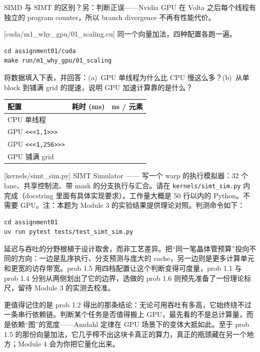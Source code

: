 \documentclass[11pt,a4paper,fontset=none]{ctexart}
\begin{document}
SIMD 与 SIMT 的区别？另：判断正误——Nvidia GPU 在 Volta 之后每个线程有独立的 program counter，所以 branch divergence 不再有性能代价。

[cuda/m1\_why\_gpu/01\_scaling.cu]
同一个向量加法，四种配置各跑一遍。

\begin{lstlisting}
cd assignment01/cuda
make run/m1_why_gpu/01_scaling
\end{lstlisting}

将数据填入下表，并回答：(a)~GPU 单线程为什么比 CPU 慢这么多？(b)~从单 block 到铺满 grid 的提速，说明 GPU 加速计算靠的是什么？

\begin{center}\small
\begin{tabular}{@{}lll@{}}
\toprule
配置 & 耗时 (ms) & ns / 元素 \\
\midrule
CPU 单线程 & & \\
GPU \texttt{<<<1,1>>>} & & \\
GPU \texttt{<<<1,256>>>} & & \\
GPU 铺满 grid & & \\
\bottomrule
\end{tabular}
\end{center}

[kernels/simt\_sim.py]
SIMT Simulator —— 写一个 warp 的执行模拟器：32 个 lane、共享控制流、带 mask 的分支执行与汇合。请在 \texttt{kernels/simt\_sim.py} 内完成（docstring 里面有具体实现要求）。工作量大概是 50 行以内的 Python。不需要 GPU。注：本题为 Module 3 的实验结果提供理论对照。判测命令如下：

\begin{lstlisting}
cd assignment01
uv run pytest tests/test_simt_sim.py
\end{lstlisting}

\begin{lookback}
延迟与吞吐的分野根植于设计取舍，而非工艺差异。把“同一笔晶体管预算”投向不同的方向：一边是乱序执行、分支预测与庞大的 cache，另一边则是更多计算单元和更宽的访存带宽。prob 1.5 用四档配置让这个判断变得可度量，prob 1.1 与 prob 1.4 分别从两侧划出了它的边界，选做的 prob 1.6 则预先准备了一份理论标尺，留待 Module 3 的实测去校准。

更值得记住的是 prob 1.2 得出的那条结论：无论可用吞吐有多高，它始终绕不过一条串行依赖链。判断某个任务是否值得搬上 GPU，最先看的不是总计算量，而是依赖“图”的宽度——Amdahl 定律在 GPU 场景下的变体大抵如此。至于 prob 1.5 的那份向量加法，它几乎榨不出这块卡真正的算力，真正的瓶颈藏在另一个地方；Module 4 会为你把它量化出来。
\end{lookback}
\end{document}
